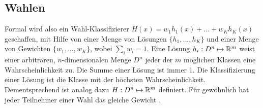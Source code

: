 \subsection{Wahlen}
Formal wird also ein \glqq Wahl\grqq-Klassifizierer $H(x) = w_1 h_1(x) + ... + w_K h_K(x)$ geschaffen, mit Hilfe von einer Menge von Lösungen $\{h_1, ..., h_K\}$ und einer Menge von Gewichten $\{w_1, ..., w_K\}$, wobei
$\sum_i w_i = 1$. Eine Lösung $h_i: D^n \mapsto {\mathbb R}^m$ weist einer arbiträren, $n$-dimensionalen Menge $D^n$ jeder der $m$ möglichen Klassen eine Wahrscheinlichkeit zu.
Die Summe einer Lösung ist immer 1. Die Klassifizierung einer Lösung ist die Klasse mit der höchsten Wahrscheinlichkeit. Dementsprechend ist analog dazu $H: D^n \mapsto {\mathbb R}^m$ definiert.
Für gewöhnlich hat jeder Teilnehmer einer Wahl das gleiche Gewicht \cite{dietterich2002ensemble}.
